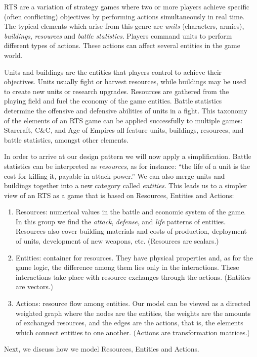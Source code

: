 RTS are a variation of strategy games where two or more players achieve specific (often conflicting) objectives by performing actions simultaneously in real time. The typical elements which arise from this genre are \textit{units} (characters, armies), \textit{buildings}, \textit{resources} and \textit{battle statistics}. Players command units to perform different types of actions. These actions can affect several entities in the game world.

Units and buildings are the entities that players control to achieve their objectives. Units usually fight or harvest resources, while buildings may be used to create new units or research upgrades. Resources are gathered from the playing field and fuel the economy of the game entities. Battle statistics determine the offensive and defensive abilities of units in a fight. This taxonomy of the elements of an RTS game can be applied successfully to multiple games: Starcraft, C\&C, and Age of Empires all feature units, buildings, resources, and battle statistics, amongst other elements.

In order to arrive at our design pattern we will now apply a simplification. Battle statistics can be interpreted as \textit{resources}, as for instance: ``the life of a unit is the cost for killing it, payable in attack power.'' We can also merge units and buildings together into a new category called \textit{entities}. This leads us to a simpler view of an RTS as a game that is based on Resources, Entities and Actions:

\begin{enumerate}
\item Resources: numerical values in the battle and economic system of the game. In this group we find the \textit{attack}, \textit{defense}, and \textit{life} patterns of entities. Resources also cover building materials and costs of production, deployment of units, development of new weapons, etc. (Resources are scalars.)
\item Entities: container for resources. They have physical properties and, as for the game logic, the difference among them lies only in the interactions. These interactions take place with resource exchanges through the actions. (Entities are vectors.)
\item Actions: resource flow among entities. Our model can be viewed as a directed weighted graph where the nodes are the entities, the weights are the amounts of exchanged resources, and the edges are the actions, that is, the elements which connect entities to one another. (Actions are transformation matrices.)
\end{enumerate}

Next, we discuss how we model Resources, Entities and Actions. 